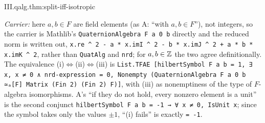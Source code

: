 \begin{theorem}
\end{theorem}
\begin{tfformal}{III.qalg.thm:split-iff-isotropic}
\begin{tffidelity}
\emph{Carrier:} here $a,b\in F$ are field elements (as A: ``with $a,b\in F$''), not integers, so the carrier is Mathlib's \texttt{QuaternionAlgebra F a 0 b} directly and the reduced norm is written out, \texttt{x.re \textasciicircum{} 2 - a * x.imI \textasciicircum{} 2 - b * x.imJ \textasciicircum{} 2 + a * b * x.imK \textasciicircum{} 2}, rather than \texttt{QuatAlg} and \texttt{nrd}; for $a,b\in\mathbb{Z}$ the two agree definitionally. The equivalence (i)$\iff$(ii)$\iff$(iii) is \texttt{List.TFAE [hilbertSymbol F a b = 1, ∃ x, x ≠ 0 ∧ nrd-expression = 0, Nonempty (QuaternionAlgebra F a 0 b ≃ₐ[F] Matrix (Fin 2) (Fin 2) F)]}, with (iii) as nonemptiness of the type of $F$-algebra isomorphisms. A's ``if they do not hold, every nonzero element is a unit'' is the second conjunct \texttt{hilbertSymbol F a b = -1 → ∀ x ≠ 0, IsUnit x}; since the symbol takes only the values $\pm1$, ``(i) fails'' is exactly \texttt{= -1}.
\end{tffidelity}
\end{tfformal}
